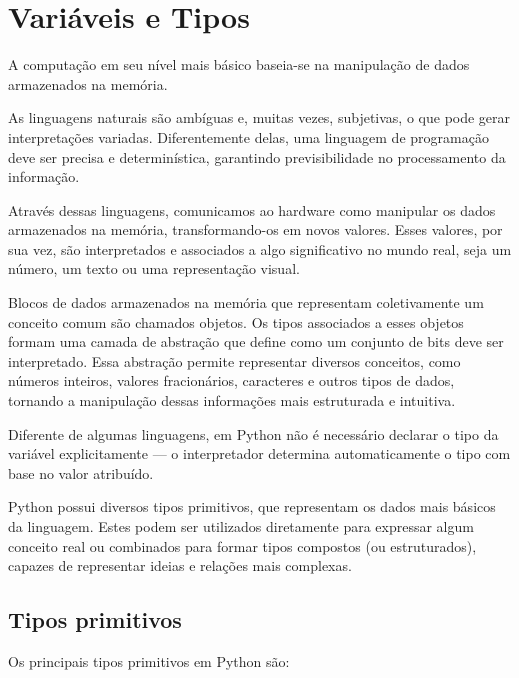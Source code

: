 \chapter{Variáveis e Tipos}\label{vars}

A computação em seu nível mais básico baseia-se na manipulação de dados armazenados na memória.

As linguagens naturais são ambíguas e, muitas vezes, subjetivas, o que pode gerar interpretações variadas.
Diferentemente delas, uma linguagem de programação deve ser precisa e determinística, garantindo previsibilidade no
processamento da informação.

Através dessas linguagens, comunicamos ao hardware como manipular os dados armazenados na memória, transformando-os
em novos valores.
Esses valores, por sua vez, são interpretados e associados a algo significativo no mundo real, seja um número, um
texto ou uma representação visual.

Blocos de dados armazenados na memória que representam coletivamente um conceito comum são chamados objetos.
Os tipos associados a esses objetos formam uma camada de abstração que define como um conjunto de bits deve ser
interpretado.
Essa abstração permite representar diversos conceitos, como números inteiros, valores fracionários, caracteres e outros
tipos de dados, tornando a manipulação dessas informações mais estruturada e intuitiva.

Diferente de algumas linguagens, em Python não é necessário declarar o tipo da variável explicitamente
--- o interpretador determina automaticamente o tipo com base no valor atribuído.

Python possui diversos tipos primitivos, que representam os dados mais básicos da linguagem.
Estes podem ser utilizados diretamente para expressar algum conceito real ou combinados para formar tipos compostos
(ou estruturados), capazes de representar ideias e relações mais complexas.


\section{Tipos primitivos}

Os principais tipos primitivos em Python são:

